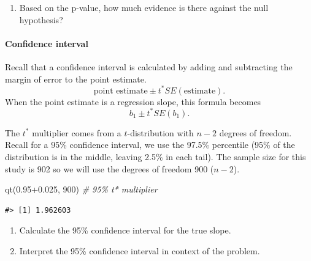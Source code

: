 \documentclass[
]{report}
\newenvironment{Shaded}{\begin{snugshade}}{\end{snugshade}}
\newcommand{\CommentTok}[1]{\textcolor[rgb]{0.56,0.35,0.01}{\textit{#1}}}
\newcommand{\DecValTok}[1]{\textcolor[rgb]{0.00,0.00,0.81}{#1}}
\newcommand{\FloatTok}[1]{\textcolor[rgb]{0.00,0.00,0.81}{#1}}
\newcommand{\FunctionTok}[1]{\textcolor[rgb]{0.00,0.00,0.00}{#1}}
\newcommand{\NormalTok}[1]{#1}
\providecommand{\tightlist}{%
  \setlength{\itemsep}{0pt}\setlength{\parskip}{0pt}}
\begin{document}
\vspace{0.5in}

\begin{enumerate}
\def\labelenumi{\arabic{enumi}.}
\setcounter{enumi}{14}
\tightlist
\item
  Based on the p-value, how much evidence is there against the null hypothesis?
\end{enumerate}

\vspace{0.5in}

\hypertarget{confidence-interval-3}{%
\paragraph*{Confidence interval}\label{confidence-interval-3}}

Recall that a confidence interval is calculated by adding and subtracting the margin of error to the point estimate.\\
\[\mbox{point estimate}\pm t^*SE(\mbox{estimate}).\]
When the point estimate is a regression slope, this formula becomes
\[b_1 \pm t^* SE(b_1).\]

The \(t^*\) multiplier comes from a \(t\)-distribution with \(n-2\) degrees of freedom. Recall for a 95\% confidence interval, we use the 97.5\% percentile (95\% of the distribution is in the middle, leaving 2.5\% in each tail). The sample size for this study is 902 so we will use the degrees of freedom 900 (\(n-2\)).

\begin{Shaded}
\begin{Highlighting}[]
\FunctionTok{qt}\NormalTok{(}\FloatTok{0.95+0.025}\NormalTok{, }\DecValTok{900}\NormalTok{) }\CommentTok{\# 95\% t* multiplier }
\end{Highlighting}
\end{Shaded}

\begin{verbatim}
#> [1] 1.962603
\end{verbatim}

\begin{enumerate}
\def\labelenumi{\arabic{enumi}.}
\setcounter{enumi}{15}
\item
  Calculate the 95\% confidence interval for the true slope.
  \vspace{0.8in}
\item
  Interpret the 95\% confidence interval in context of the problem.
\end{enumerate}
\end{document}

